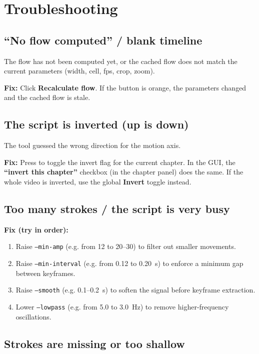 \documentclass[11pt,a4paper]{article}
\newcommand{\code}[1]{\texttt{#1}}
\newcommand{\key}[1]{\fbox{\small\texttt{#1}}}
\begin{document}
\section{Troubleshooting}
\label{sec:trouble}

\subsection{``No flow computed'' / blank timeline}

The flow has not been computed yet, or the cached flow does not match the current parameters (width, cell, fps, crop, zoom).

\textbf{Fix:} Click \textbf{Recalculate flow}. If the button is orange, the parameters changed and the cached flow is stale.

\subsection{The script is inverted (up is down)}

The tool guessed the wrong direction for the motion axis.

\textbf{Fix:} Press \key{I} to toggle the invert flag for the current chapter. In the GUI, the \textbf{``invert this chapter''} checkbox (in the chapter panel) does the same. If the whole video is inverted, use the global \textbf{Invert} toggle instead.

\subsection{Too many strokes / the script is very busy}

\textbf{Fix (try in order):}
\begin{enumerate}[noitemsep]
  \item Raise \code{--min-amp} (e.g. from 12 to 20--30) to filter out smaller movements.
  \item Raise \code{--min-interval} (e.g. from 0.12 to 0.20~s) to enforce a minimum gap between keyframes.
  \item Raise \code{--smooth} (e.g. 0.1--0.2~s) to soften the signal before keyframe extraction.
  \item Lower \code{--lowpass} (e.g. from 5.0 to 3.0~Hz) to remove higher-frequency oscillations.
\end{enumerate}

\subsection{Strokes are missing or too shallow}
\end{document}
